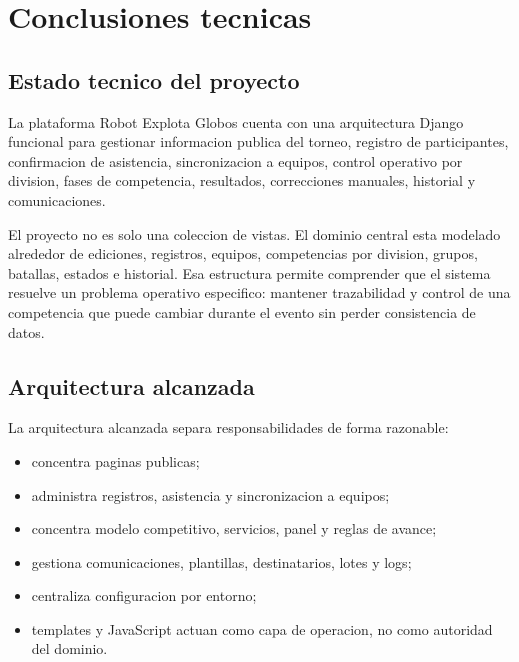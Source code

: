 \chapter{Conclusiones tecnicas}
\label{chap:conclusiones-tecnicas}

\section{Estado tecnico del proyecto}
\label{sec:conclusiones-estado}

La plataforma Robot Explota Globos cuenta con una arquitectura Django funcional para gestionar informacion publica del torneo, registro de participantes, confirmacion de asistencia, sincronizacion a equipos, control operativo por division, fases de competencia, resultados, correcciones manuales, historial y comunicaciones.

El proyecto no es solo una coleccion de vistas. El dominio central esta modelado alrededor de ediciones, registros, equipos, competencias por division, grupos, batallas, estados e historial. Esa estructura permite comprender que el sistema resuelve un problema operativo especifico: mantener trazabilidad y control de una competencia que puede cambiar durante el evento sin perder consistencia de datos.

\section{Arquitectura alcanzada}
\label{sec:conclusiones-arquitectura}

La arquitectura alcanzada separa responsabilidades de forma razonable:

\begin{itemize}
  \item {} concentra paginas publicas;
  \item {} administra registros, asistencia y sincronizacion a equipos;
  \item {} concentra modelo competitivo, servicios, panel y reglas de avance;
  \item {} gestiona comunicaciones, plantillas, destinatarios, lotes y logs;
  \item {} centraliza configuracion por entorno;
  \item templates y JavaScript actuan como capa de operacion, no como autoridad del dominio.
\end{itemize}

